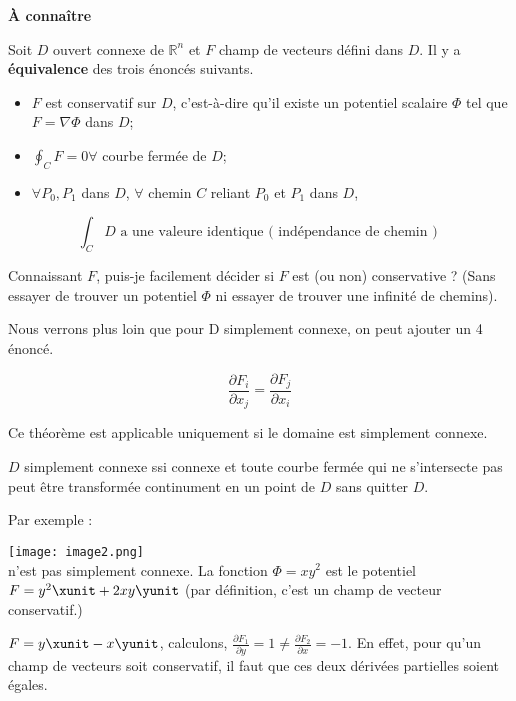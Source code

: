 \begin{mytheo}

\textbf{À connaître}

Soit $D$ ouvert connexe de $\mathbb{R}^n$ et $F$ champ de vecteurs défini dans $D$. Il y a \textbf{équivalence} des trois énoncés suivants.

\begin{itemize}
\item $F$ est conservatif sur $D$, c'est-à-dire qu'il existe un potentiel scalaire $\Phi$ tel que $F=\nabla \Phi $ dans $D$;
\item $\oint_C F =0 \forall $ courbe fermée de $D$;
\item $\forall P_0,P_1$ dans $D$, $\forall$ chemin $C$ reliant $P_0$ et $P_1$ dans $D$,
\end{itemize}
\[\int_C D \text{ a une valeure identique ( indépendance de chemin ) }\]

\end{mytheo}

\begin{mytheo}

Connaissant $F$, puis-je facilement décider si $F$ est (ou non) conservative ? (Sans essayer de trouver un potentiel $\Phi$ ni essayer de trouver une infinité de chemins).

Nous verrons plus loin que pour D simplement connexe, on peut ajouter un 4\ieme{} énoncé.

$$\frac{\partial F_i}{\partial x_j} = \frac{\partial F_j}{\partial x_i}$$

Ce théorème est applicable uniquement si le domaine est simplement connexe.
\end{mytheo}

\begin{mydef}
$D$ simplement connexe ssi connexe et toute courbe fermée qui ne s'intersecte pas peut être  transformée continument en un point de $D$ sans quitter $D$.
\end{mydef}

Par exemple :

\texttt{[image: image2.png]}\\
n'est pas simplement connexe.
La fonction $ \Phi =xy^2 $  est le potentiel $F=y^2\xunit +2xy\yunit$ (par définition, c'est un champ de vecteur conservatif.)

$F= y\xunit-x\yunit$, calculons, $\frac{\partial F_1}{\partial y} = 1 \neq \frac{\partial F_2}{\partial x} = -1$. En effet, pour qu'un champ de vecteurs soit conservatif, il faut que ces deux dérivées partielles soient égales.

